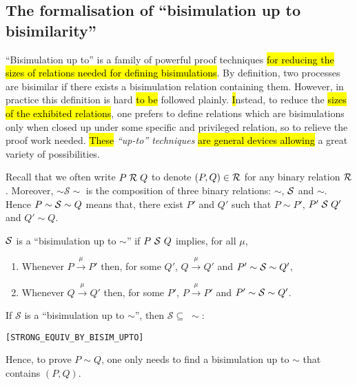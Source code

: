 \subsection{The formalisation of ``bisimulation up to bisimilarity''}

``Bisimulation up to'' is a family of powerful proof techniques
\hl{for reducing the sizes of relations needed for defining bisimulations}.
By definition, two processes are bisimilar if there exists a
bisimulation relation containing them. However, in practice
this definition is hard \hl{to be} followed plainly. \hl{I}nstead, to reduce
the \hl{sizes of the exhibited relations}, one prefers to define relations
which are bisimulations only when closed up under some specific and
privileged relation, so to relieve the proof work needed. \hl{These}
\emph{``up-to'' techniques} \hl{are general devices allowing} a great variety of possibilities.

Recall that we often write $P \;\R\; Q$ to denote
$(P, Q) \in \R$ for any binary relation $\R$. 
Moreover, 
 $\sim \mathcal{S} \sim$ is the composition of three binary
relations: $\sim$, $\S$ and $\sim$. Hence $P \sim \S \sim Q$ means that,
there exist $P'$ and $Q'$ such that $P \sim P'$, $P' \;\S\; Q'$ and $Q' \sim Q$.
\begin{definition}%
  \label{def:bisimUptoSim}
$\S$ is a ``bisimulation up to $\sim$'' if $P\ \S\ Q$ implies, for all $\mu$,
\begin{enumerate}
\item Whenever $P \overset{\mu}{\rightarrow} P'$ then, for some
  $Q'$, $Q \overset{\mu}{\rightarrow} Q'$ and $P' \sim \S
  \sim Q'$,
\item Whenever $Q \overset{\mu}{\rightarrow} Q'$ then, for some
  $P'$, $P \overset{\mu}{\rightarrow} P'$ and $P' \sim \S
  \sim Q'$.
\end{enumerate}
\end{definition}

\begin{theorem}
If $\mathcal{S}$ is a ``bisimulation up to $\sim$'', then
$\mathcal{S} \subseteq\;\sim$:
\begin{alltt}
\HOLTokenTurnstile{}   \HOLSymConst{\HOLTokenConj{}}    \HOLSymConst{\HOLTokenImp{}}  \HOLSymConst{\HOLTokenStrongEQ} \hfill{[STRONG_EQUIV_BY_BISIM_UPTO]}
\end{alltt}
\end{theorem}
Hence, to prove $P \sim Q$, one only needs to find a bisimulation
up to $\sim$ that contains $(P, Q)$.

